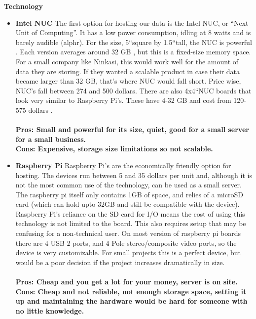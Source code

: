 \documentclass[draftclsnofoot,onecolumn,letterpaper,10pt]{IEEEtran}
\begin{document}
		\textbf{Technology}
			\begin{itemize}
				\item{\textbf{Intel NUC}}
					The first option for hosting our data is the Intel NUC, or “Next Unit of Computing”.
					It has a low power consumption, idling at 8 watts and is barely audible (alphr). For the size, 5\textquotedblleft square by 1.5\textquotedblleft tall, the NUC is powerful \cite{IntelNUCReview}.
					Each version averages around 32 GB \cite{Intel}, but this is a fixed-size memory space.
					For a small company like Ninkasi, this would work well for the amount of data they are storing.
					If they wanted a scalable product in case their data became larger than 32 GB, that’s where NUC would fall short.
					Price wise, NUC's  fall between 274 and 500 dollars\cite{PCWorld}.
					There are also 4x4\textquotedblleft NUC boards that look very similar to Raspberry Pi's.
					These have 4-32 GB and cost from 120-575 dollars \cite{Intel}.
					\\ \\
					\textbf{Pros: Small and powerful for its size, quiet, good for a small server for a small business.}
					\\
					\textbf{Cons: Expensive, storage size limitations so not scalable.}


				\item{\textbf{Raspberry Pi}}
					Raspberry Pi's are the economically friendly option for hosting.
					The devices run between 5 and 35 dollars per unit and, although it is not the most common use of the technology, can be used as a small server\cite{CopaHost}.
					The raspberry pi itself only contains 1GB of space, and relies of a microSD card (which can hold upto 32GB and still be compatible with the device)\cite{CopaHost}.
					Raspberry Pi’s reliance on the SD card for I/O means the cost of using this technology is not limited to the board.
					This also requires setup that may be confusing for a non-technical user.
					On most version of raspberry pi boards there are 4 USB 2 ports, and 4 Pole stereo/composite video ports\cite{RaspberryPi}, so the device is very customizable.
					For small projects this is a perfect device, but would be a poor decision if the project increases dramatically in size.
					\\\\
					\textbf{Pros: Cheap and you get a lot for your money, server is on site.}
					\\
					\textbf{Cons: Cheap and not reliable, not enough storage space, setting it up and maintaining the hardware would be hard for someone with no little knowledge.}


\end{itemize}
\end{document}
